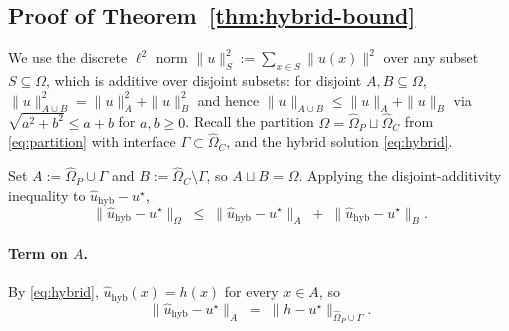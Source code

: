 \subsection{Proof of Theorem~\ref{thm:hybrid-bound}}
\label{app:hybrid}

We use the discrete $\ell^2$ norm
$\|u\|_S^2:=\sum_{x\in S}\|u(x)\|^2$ over any subset $S\subseteq\Omega$,
which is additive over disjoint subsets: for disjoint $A,B\subseteq\Omega$,
$\|u\|_{A\cup B}^2=\|u\|_A^2+\|u\|_B^2$ and hence
$\|u\|_{A\cup B}\leq\|u\|_A+\|u\|_B$ via $\sqrt{a^2+b^2}\leq a+b$ for
$a,b\geq 0$. Recall the partition
$\Omega=\widehat{\Omega}_P\sqcup\widehat{\Omega}_C$ from
\eqref{eq:partition} with interface $\Gamma\subset\widehat{\Omega}_C$,
and the hybrid solution \eqref{eq:hybrid}.

Set $A:=\widehat{\Omega}_P\cup\Gamma$ and
$B:=\widehat{\Omega}_C\setminus\Gamma$, so $A\sqcup B=\Omega$. Applying
the disjoint-additivity inequality to
$\widehat{u}_{\mathrm{hyb}}-u^\star$,
\begin{equation}
  \bigl\|\widehat{u}_{\mathrm{hyb}}-u^\star\bigr\|_{\Omega}
  \;\leq\;
  \bigl\|\widehat{u}_{\mathrm{hyb}}-u^\star\bigr\|_{A}
  \;+\;
  \bigl\|\widehat{u}_{\mathrm{hyb}}-u^\star\bigr\|_{B}.
  \label{eq:split-norm}
\end{equation}

\paragraph{Term on $A$.}
By \eqref{eq:hybrid}, $\widehat{u}_{\mathrm{hyb}}(x)=h(x)$ for every
$x\in A$, so
\begin{equation}
  \bigl\|\widehat{u}_{\mathrm{hyb}}-u^\star\bigr\|_{A}
  \;=\;\bigl\|h-u^\star\bigr\|_{\widehat{\Omega}_P\cup\Gamma}.
  \label{eq:hyb-term-A}
\end{equation}

